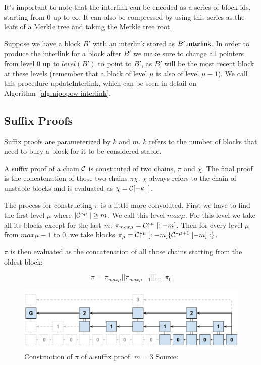 It's important to note that the interlink can be encoded as a series of block ids, starting from $0$ up to $\infty$. It can also be compressed by using this series as the leafs of a Merkle tree and taking the Merkle tree root.

Suppose we have a block $B'$ with an interlink stored as $B'.{\sf interlink}$. In order to produce the interlink for a block after $B'$ we make sure to change all pointers from level $0$ up to $level(B')$ to point to $B'$, as $B'$ will be the most recent block at these levels (remember that a block of level $\mu$ is also of level $\mu-1$). We call this procedure {\sf updateInterlink}, which can be seen in detail on Algorithm~\ref{alg.nipopow-interlink}.



\subsection{Suffix Proofs}
Suffix proofs are parameterized by $k$ and $m$. $k$ refers to the number of blocks that need to bury a block for it to be considered stable.

A suffix proof of a chain $\mathcal{C}$ is constituted of two chains, $\pi$ and $\chi$. The final proof is the concatenation of those two chains $\pi \chi$. $\chi$ always refers to the chain of unstable blocks and is evaluated as $\chi = \mathcal{C}[-k:]$.

The process for constructing $\pi$ is a little more convoluted. First we have to find the first level $\mu$ where $|\mathcal{C}\negthickspace\uparrow^\mu| \ge m$. We call this level $max\mu$. For this level we take all its blocks except for the last $m$: $\pi_{max\mu} = \mathcal{C}\negthickspace\uparrow^\mu[:-m]$. Then for every level $\mu$ from $max\mu - 1$ to $0$, we take blocks $\pi_\mu = \mathcal{C}\negthickspace\uparrow^\mu [:-m]\{\mathcal{C}\negthickspace\uparrow^{\mu+1}[-m]:\}$.

$\pi$ is then evaluated as the concatenation of all those chains starting from the oldest block:

$$ \pi = \pi_{max\mu} || \pi_{max\mu-1} || \ldots || \pi_0 $$

\begin{figure}
  \centering
  \includegraphics[width=0.9\columnwidth,keepaspectratio]{figures/non-interactive-popow.pdf}
  \caption{Construction of $\pi$ of a suffix proof. $m=3$  Source:~\cite{nipopows}}
  \label{fig:suffix-proof}
\end{figure}

